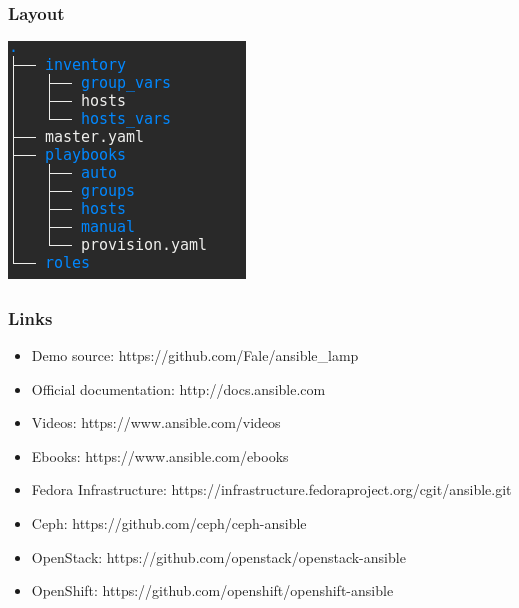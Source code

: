 \documentclass[t,aspectratio=169]{beamer}
\begin{document}
\begin{frame}
    \frametitle{Layout}
    \begin{center}
        \includegraphics[scale=0.5]{project_structure.png}
    \end{center}
\end{frame}

\begin{frame}
    \frametitle{Links}
    \begin{itemize}
        \item Demo source: https://github.com/Fale/ansible\_lamp
        \item Official documentation: http://docs.ansible.com
        \item Videos: https://www.ansible.com/videos
        \item Ebooks: https://www.ansible.com/ebooks
        \item Fedora Infrastructure: https://infrastructure.fedoraproject.org/cgit/ansible.git
        \item Ceph: https://github.com/ceph/ceph-ansible
        \item OpenStack: https://github.com/openstack/openstack-ansible
        \item OpenShift: https://github.com/openshift/openshift-ansible
    \end{itemize}
\end{frame}

\end{document}
